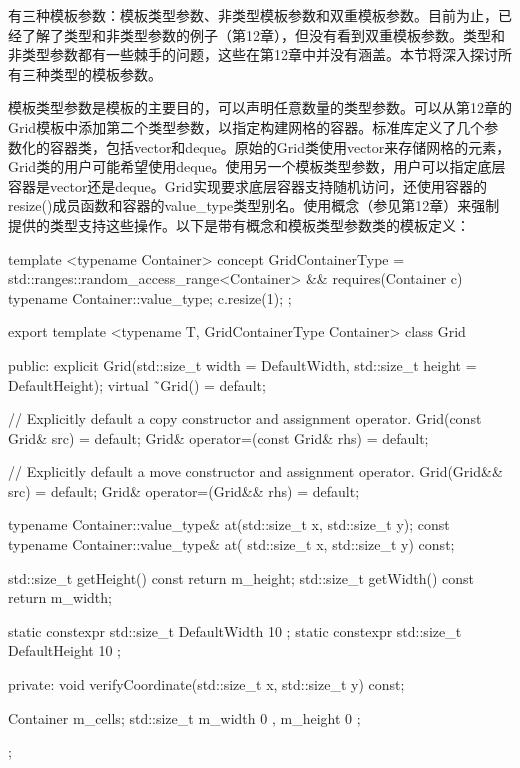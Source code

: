 
有三种模板参数：模板类型参数、非类型模板参数和双重模板参数。目前为止，已经了解了类型和非类型参数的例子（第12章），但没有看到双重模板参数。类型和非类型参数都有一些棘手的问题，这些在第12章中并没有涵盖。本节将深入探讨所有三种类型的模板参数。


模板类型参数是模板的主要目的，可以声明任意数量的类型参数。可以从第12章的Grid模板中添加第二个类型参数，以指定构建网格的容器。标准库定义了几个参数化的容器类，包括vector和deque。原始的Grid类使用vector来存储网格的元素，Grid类的用户可能希望使用deque。使用另一个模板类型参数，用户可以指定底层容器是vector还是deque。Grid实现要求底层容器支持随机访问，还使用容器的resize()成员函数和容器的value\_type类型别名。使用概念（参见第12章）来强制提供的类型支持这些操作。以下是带有概念和模板类型参数类的模板定义：

\begin{cpp}
template <typename Container>
concept GridContainerType =
    std::ranges::random_access_range<Container> &&
    requires(Container c) {
        typename Container::value_type;
        c.resize(1);
    };

export template <typename T, GridContainerType Container>
class Grid
{
    public:
        explicit Grid(std::size_t width = DefaultWidth,
            std::size_t height = DefaultHeight);
        virtual ˜Grid() = default;

        // Explicitly default a copy constructor and assignment operator.
        Grid(const Grid& src) = default;
        Grid& operator=(const Grid& rhs) = default;

        // Explicitly default a move constructor and assignment operator.
        Grid(Grid&& src) = default;
        Grid& operator=(Grid&& rhs) = default;

        typename Container::value_type& at(std::size_t x, std::size_t y);
        const typename Container::value_type& at(
            std::size_t x, std::size_t y) const;

        std::size_t getHeight() const { return m_height; }
        std::size_t getWidth() const { return m_width; }

        static constexpr std::size_t DefaultWidth { 10 };
        static constexpr std::size_t DefaultHeight { 10 };

    private:
        void verifyCoordinate(std::size_t x, std::size_t y) const;

        Container m_cells;
        std::size_t m_width { 0 }, m_height { 0 };
};
\end{cpp}

